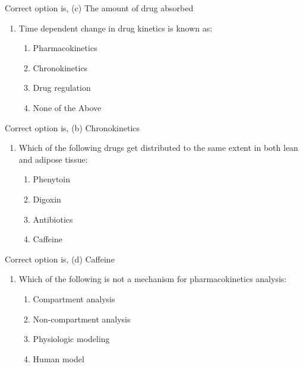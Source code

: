 \documentclass[12pt,a4paper]{article}
\begin{document}
    Correct option is, (c) The amount of drug absorbed
    
    \pagebreak

    \vspace*{0.5cm}

    \begin{enumerate}[label=17.]
        \item Time dependent change in drug kinetics is known as:
        \begin{enumerate}
            \item Pharmacokinetics
            \item Chronokinetics
            \item Drug regulation
            \item None of the Above
        \end{enumerate}
    \end{enumerate}

    Correct option is, (b) Chronokinetics

    \vspace*{0.5cm}

    \begin{enumerate}[label=18.]
        \item Which of the following drugs get distributed to the same extent in both lean and adipose tissue:
        \begin{enumerate}
            \item Phenytoin
            \item Digoxin
            \item Antibiotics
            \item Caffeine
        \end{enumerate}
    \end{enumerate}

    Correct option is, (d) Caffeine

    \vspace*{0.5cm}

    \begin{enumerate}[label=19.]
        \item Which of the following is not a mechanism for pharmacokinetics analysis:
        \begin{enumerate}
            \item Compartment analysis
            \item Non-compartment analysis
            \item Physiologic modeling
            \item Human model
        \end{enumerate}
    \end{enumerate}
\end{document}
